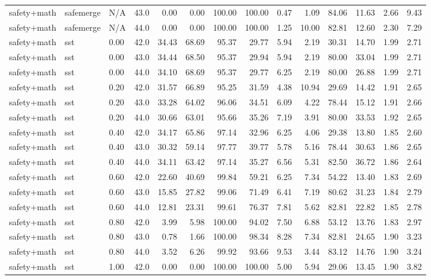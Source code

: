 \documentclass{article}
\begin{document}
\begin{table}[H]
{\begin{tabular}{llllrrrrrrrrrr}
safety+math & safemerge & N/A & 43.0 & 0.00 & 0.00 & 100.00 & 100.00 & 0.47 & 1.09 & 84.06 & 11.63 & 2.66 & 9.43 \\
safety+math & safemerge & N/A & 44.0 & 0.00 & 0.00 & 100.00 & 100.00 & 1.25 & 10.00 & 82.81 & 12.60 & 2.30 & 7.29 \\
safety+math & sst & 0.00 & 42.0 & 34.43 & 68.69 & 95.37 & 29.77 & 5.94 & 2.19 & 30.31 & 14.70 & 1.99 & 2.71 \\
safety+math & sst & 0.00 & 43.0 & 34.44 & 68.50 & 95.37 & 29.94 & 5.94 & 2.19 & 80.00 & 33.04 & 1.99 & 2.71 \\
safety+math & sst & 0.00 & 44.0 & 34.10 & 68.69 & 95.37 & 29.77 & 6.25 & 2.19 & 80.00 & 26.88 & 1.99 & 2.71 \\
safety+math & sst & 0.20 & 42.0 & 31.57 & 66.89 & 95.25 & 31.59 & 4.38 & 10.94 & 29.69 & 14.42 & 1.91 & 2.65 \\
safety+math & sst & 0.20 & 43.0 & 33.28 & 64.02 & 96.06 & 34.51 & 6.09 & 4.22 & 78.44 & 15.12 & 1.91 & 2.66 \\
safety+math & sst & 0.20 & 44.0 & 30.66 & 63.01 & 95.66 & 35.26 & 7.19 & 3.91 & 80.00 & 33.53 & 1.92 & 2.65 \\
safety+math & sst & 0.40 & 42.0 & 34.17 & 65.86 & 97.14 & 32.96 & 6.25 & 4.06 & 29.38 & 13.80 & 1.85 & 2.60 \\
safety+math & sst & 0.40 & 43.0 & 30.32 & 59.14 & 97.77 & 39.77 & 5.78 & 5.16 & 78.44 & 30.63 & 1.86 & 2.65 \\
safety+math & sst & 0.40 & 44.0 & 34.11 & 63.42 & 97.14 & 35.27 & 6.56 & 5.31 & 82.50 & 36.72 & 1.86 & 2.64 \\
safety+math & sst & 0.60 & 42.0 & 22.60 & 40.69 & 99.84 & 59.21 & 6.25 & 7.34 & 54.22 & 13.40 & 1.83 & 2.69 \\
safety+math & sst & 0.60 & 43.0 & 15.85 & 27.82 & 99.06 & 71.49 & 6.41 & 7.19 & 80.62 & 31.23 & 1.84 & 2.79 \\
safety+math & sst & 0.60 & 44.0 & 12.81 & 23.31 & 99.61 & 76.37 & 7.81 & 5.62 & 82.81 & 22.82 & 1.85 & 2.78 \\
safety+math & sst & 0.80 & 42.0 & 3.99 & 5.98 & 100.00 & 94.02 & 7.50 & 6.88 & 53.12 & 13.76 & 1.83 & 2.97 \\
safety+math & sst & 0.80 & 43.0 & 0.78 & 1.66 & 100.00 & 98.34 & 8.28 & 7.34 & 82.81 & 24.65 & 1.90 & 3.23 \\
safety+math & sst & 0.80 & 44.0 & 3.52 & 6.26 & 99.92 & 93.66 & 9.53 & 3.44 & 83.12 & 14.76 & 1.90 & 3.24 \\
safety+math & sst & 1.00 & 42.0 & 0.00 & 0.00 & 100.00 & 100.00 & 5.00 & 5.94 & 29.06 & 13.45 & 1.90 & 3.82 \\

\end{tabular}}
\end{table}
\end{document}
